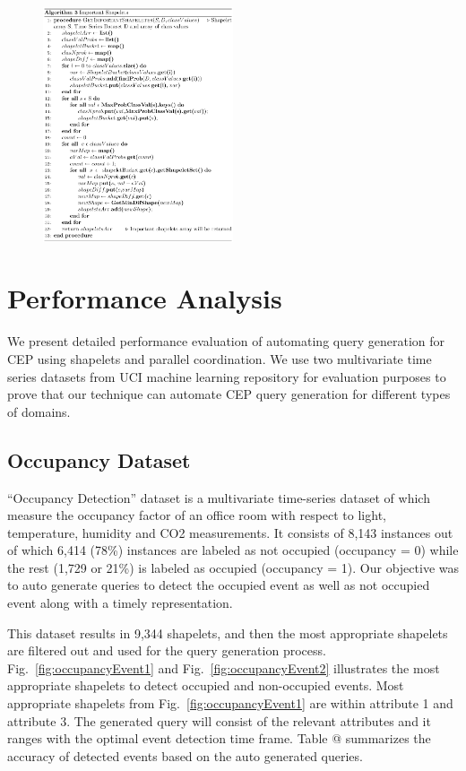 \documentclass[conference]{IEEEtran}  %
\makeatletter
\newcommand*{\rom}[1]{\expandafter\@slowromancap\romannumeral #1@}
\makeatother
\begin{document}
\begin{figure}
\includegraphics[width=0.5\textwidth]{algo3.png}
\end{figure}

\section{Performance Analysis}
We present detailed performance evaluation of automating query generation for CEP using shapelets and parallel coordination. We use two multivariate time series datasets from UCI machine learning repository \cite{IEEEexample:Ocupancy,IEEEexample:EEG} for evaluation purposes to prove that our technique can automate CEP query generation for different types of domains.

\subsection{Occupancy Dataset} 
“Occupancy Detection” dataset \cite{IEEEexample:Ocupancy} is a multivariate time-series dataset of which measure the occupancy factor of an office room with respect to light, temperature, humidity and CO2 measurements. It consists of 8,143 instances out of which 6,414 (78\%) instances are labeled as not occupied (occupancy = 0) while the rest (1,729 or 21\%) is labeled as occupied (occupancy = 1). Our objective was to auto generate queries to detect the occupied event as well as not occupied event along with a timely representation.

This dataset results in 9,344 shapelets, and then the most appropriate shapelets are filtered out and used for the query generation process. Fig.~\ref{fig:occupancyEvent1} and Fig.~\ref{fig:occupancyEvent2} illustrates the most appropriate shapelets to detect occupied and non-occupied events. Most appropriate shapelets from Fig.~\ref{fig:occupancyEvent1} are within attribute 1 and attribute 3. The generated query will consist of the relevant attributes and it ranges with the optimal event detection time frame. Table \rom{1} summarizes the accuracy of detected events based on the auto generated queries.  
\end{document}
